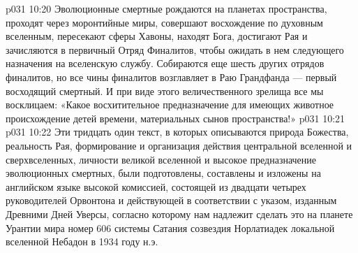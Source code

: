 \vs p031 10:20 \pc Эволюционные смертные рождаются на планетах пространства, проходят через моронтийные миры, совершают восхождение по духовным вселенным, пересекают сферы Хавоны, находят Бога, достигают Рая и зачисляются в первичный Отряд Финалитов, чтобы ожидать в нем следующего назначения на вселенскую службу. Собираются еще шесть других отрядов финалитов, но все чины финалитов возглавляет в Раю Грандфанда --- первый восходящий смертный. И при виде этого величественного зрелища все мы восклицаем: «Какое восхитительное предназначение для имеющих животное происхождение детей времени, материальных сынов пространства!»
\vs p031 10:21 
\separatorline
\vsetoff
\vs p031 10:22 Эти тридцать один текст, в которых описываются природа Божества, реальность Рая, формирование и организация действия центральной вселенной и сверхвселенных, личности великой вселенной и высокое предназначение эволюционных смертных, были подготовлены, составлены и изложены на английском языке высокой комиссией, состоящей из двадцати четырех руководителей Орвонтона и действующей в соответствии с указом, изданным Древними Дней Уверсы, согласно которому нам надлежит сделать это на планете Урантии мира номер 606 системы Сатания созвездия Норлатиадек локальной вселенной Небадон в 1934 году н.э.
